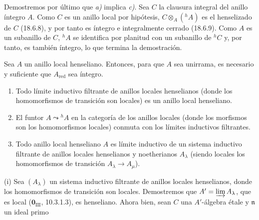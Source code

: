 Demostremos por último que \emph{a)} implica \emph{c)}. Sea $C$ la clausura integral del anillo íntegro $A$. Como $C$ es un anillo local por hipótesis, $C\otimes_A({}^h\!A)$ es el henselizado de $C$ (18.6.8), y por tanto es íntegro e integralmente cerrado (18.6.9). Como $A$ es un subanillo de $C$, ${}^h\!A$ se identifica por planitud con un subanillo de ${}^h\!C$ y, por tanto, es también íntegro, lo que termina la demostración.

\begin{corollary}[18.6.13]
\label{IV.18.6.13}
Sea $A$ un anillo local henseliano. Entonces, para que $A$ sea unirrama, es necesario y suficiente que $A_{\mathrm{red}}$ sea íntegro.
\end{corollary}

\begin{proposition}[18.6.14]
\label{IV.18.6.14}
\begin{enumerate}
  \item[\textup{(i)}] Todo límite inductivo filtrante de anillos locales henselianos (donde los homomorfismos de transición son locales) es un anillo local henseliano.
  \item[\textup{(ii)}] El funtor $A\leadsto{}^h\!A$ en la categoría de los anillos locales (donde los morfismos son los homomorfismos locales) conmuta con los límites inductivos filtrantes.
  \item[\textup{(iii)}] Todo anillo local henseliano $A$ es límite inductivo de un sistema inductivo filtrante de anillos locales henselianos y noetherianos $A_\lambda$ (siendo locales los homomorfismos de transición $A_\lambda\to A_\mu$).
\end{enumerate}
\end{proposition}

(i) Sea $(A_\lambda)$ un sistema inductivo filtrante de anillos locales henselianos, donde los homomorfismos de transición son locales. Demostremos que $A'=\varinjlim A_\lambda$, que es local ($\mathbf{0}_{\mathrm{III}}$, 10.3.1.3), es henseliano. Ahora bien, sean $C$ una $A'$-álgebra étale y $\mathfrak n$ un ideal primo


